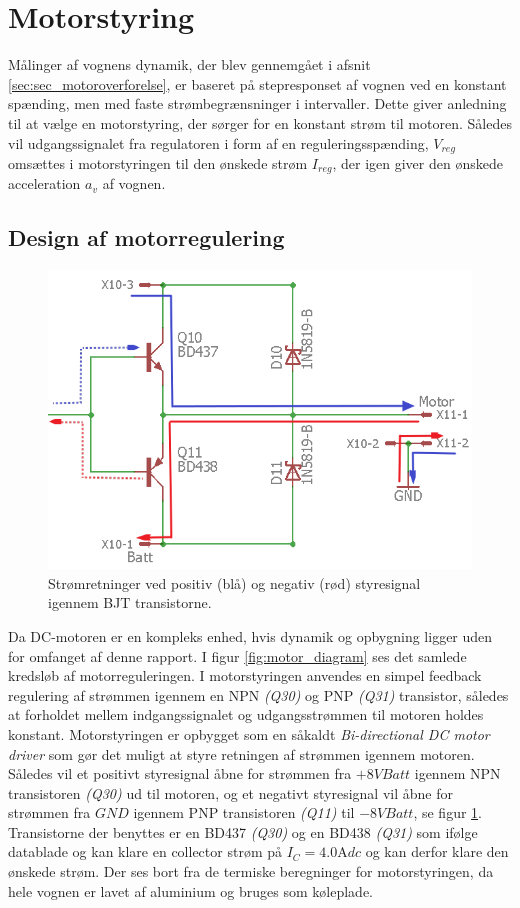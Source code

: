\section{Motorstyring }\label{sec:sec_motorstyring}
Målinger af vognens dynamik, der blev gennemgået i afsnit \ref{sec:sec_motoroverforelse}, er baseret på stepresponset af vognen ved en konstant spænding, men med faste strømbegrænsninger i intervaller.
Dette giver anledning til at vælge en motorstyring, der sørger for en konstant strøm til motoren.
Således vil udgangssignalet fra regulatoren i form af en reguleringsspænding, $V_{reg}$ omsættes i motorstyringen til den ønskede strøm $I_{reg}$, der igen giver den ønskede acceleration $a_v$ af vognen.  

\subsection{Design af motorregulering}
\begin{figure}
	\centering
	\includegraphics[width=.45\textwidth]{billeder/motor_bidirectional.png}
	\caption{Strømretninger ved positiv (blå) og negativ (rød) styresignal igennem BJT transistorne.}
	\label{fig:motor_bidirectional}
\end{figure}
Da DC-motoren er en kompleks enhed, hvis dynamik og opbygning ligger uden for omfanget af denne rapport. 
I figur \ref{fig:motor_diagram} ses det samlede kredsløb af motorreguleringen.
I motorstyringen anvendes en simpel feedback regulering af strømmen igennem en NPN \emph{(Q30)} og PNP \emph{(Q31)} transistor, således at forholdet mellem indgangssignalet og udgangsstrømmen til motoren holdes konstant.
Motorstyringen er opbygget som en såkaldt \textit{ Bi-directional DC motor driver} som gør det muligt at styre retningen af strømmen igennem motoren.
Således vil et positivt styresignal åbne for strømmen fra $+8V Batt$ igennem NPN transistoren \emph{(Q30)} ud til motoren, og et negativt styresignal vil åbne for strømmen fra $GND$ igennem PNP transistoren \emph{(Q11)} til $-8V Batt$, se figur \ref{fig:motor_bidirectional}.
Transistorne der benyttes er en BD437 \emph{(Q30)} og en BD438 \emph{(Q31)} som  ifølge datablade \cite{BD437} og \cite{BD438} kan klare en collector strøm på $I_C= 4.0 \si{\ampere}dc$ og kan derfor klare den ønskede strøm.
Der ses bort fra de termiske beregninger for motorstyringen, da hele vognen er lavet af aluminium og bruges som køleplade.

